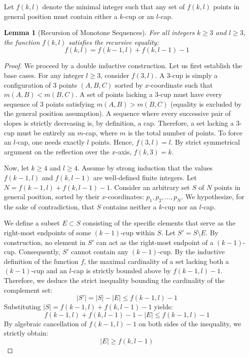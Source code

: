 \documentclass[11pt,a4paper]{article}
\newtheorem{lemma}[theorem]{Lemma}
\begin{document}
Let $f(k, l)$ denote the minimal integer such that any set of $f(k,l)$ points in general position must contain either a $k$-cup or an $l$-cap.

\begin{lemma}[Recursion of Monotone Sequences]\label{lem:recursion}
For all integers $k \ge 3$ and $l \ge 3$, the function $f(k, l)$ satisfies the recursive equality:
\begin{equation}
f(k, l) = f(k-1, l) + f(k, l-1) - 1
\end{equation}
\end{lemma}

\begin{proof}
We proceed by a double inductive construction. Let us first establish the base cases.
For any integer $l \ge 3$, consider $f(3, l)$. A $3$-cup is simply a configuration of 3 points $(A, B, C)$ sorted by $x$-coordinate such that $m(A, B) < m(B, C)$. A set of points lacking a $3$-cup must have every sequence of 3 points satisfying $m(A, B) > m(B, C)$ (equality is excluded by the general position assumption). A sequence where every successive pair of slopes is strictly decreasing is, by definition, a cap. Therefore, a set lacking a $3$-cup must be entirely an $m$-cap, where $m$ is the total number of points. To force an $l$-cap, one needs exactly $l$ points. Hence, $f(3, l) = l$. By strict symmetrical argument on the reflection over the $x$-axis, $f(k, 3) = k$.

Now, let $k \ge 4$ and $l \ge 4$. Assume by strong induction that the values $f(k-1, l)$ and $f(k, l-1)$ are well-defined finite integers. Let $N = f(k-1, l) + f(k, l-1) - 1$.
Consider an arbitrary set $S$ of $N$ points in general position, sorted by their $x$-coordinates: $p_1, p_2, \dots, p_N$.
We hypothesize, for the sake of contradiction, that $S$ contains neither a $k$-cup nor an $l$-cap.

We define a subset $E \subset S$ consisting of the specific elements that serve as the right-most endpoints of some $(k-1)$-cup within $S$.
Let $S' = S \setminus E$. By construction, no element in $S'$ can act as the right-most endpoint of a $(k-1)$-cup. Consequently, $S'$ cannot contain any $(k-1)$-cup.
By the inductive definition of the function $f$, the maximal cardinality of a set lacking both a $(k-1)$-cup and an $l$-cap is strictly bounded above by $f(k-1, l) - 1$.
Therefore, we deduce the strict inequality bounding the cardinality of the complement set:
\begin{equation}
|S'| = |S| - |E| \le f(k-1, l) - 1
\end{equation}
Substituting $|S| = f(k-1, l) + f(k, l-1) - 1$ yields:
\begin{equation}
f(k-1, l) + f(k, l-1) - 1 - |E| \le f(k-1, l) - 1
\end{equation}
By algebraic cancellation of $f(k-1, l) - 1$ on both sides of the inequality, we strictly obtain:
\begin{equation}
|E| \ge f(k, l-1)
\end{equation}


\end{proof}
\end{document}
